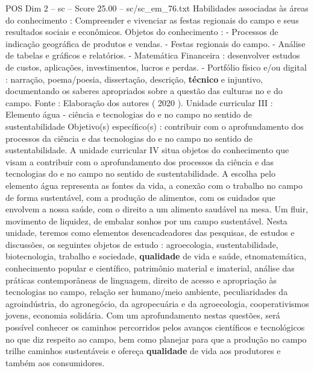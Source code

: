 \begin{textsample}{POS Dim 2 – sc – Score 25.00 – sc/sc\_em\_76.txt}
Habilidades associadas às áreas do conhecimento : Compreender e vivenciar as festas regionais do campo e seus resultados sociais e econômicos.
Objetos do conhecimento : - Processos de indicação geográfica de produtos e vendas. - Festas regionais do campo. - Análise de tabelas e gráficos e relatórios. - Matemática Financeira : desenvolver estudos de custos, aplicações, investimentos, lucros e perdas. - Portfólio físico e/ou digital : narração, poema/poesia, dissertação, descrição, \textbf{técnico} e injuntivo, documentando os saberes apropriados sobre a questão das culturas no e do campo.
Fonte : Elaboração dos autores ( 2020 ).
Unidade curricular III : Elemento água - ciência e tecnologias do e no campo no sentido de sustentabilidade Objetivo(s) específico(s) : contribuir com o aprofundamento dos processos da ciência e das tecnologias do e no campo no sentido de sustentabilidade.
A unidade curricular IV situa objetos do conhecimento que visam a contribuir com o aprofundamento dos processos da ciência e das tecnologias do e no campo no sentido de sustentabilidade.
A escolha pelo elemento água representa as fontes da vida, a conexão com o trabalho no campo de forma sustentável, com a produção de alimentos, com os cuidados que envolvem a nossa saúde, com o direito a um alimento saudável na mesa.
Um fluir, movimento de liquidez, de embalar sonhos por um campo sustentável.
Nesta unidade, teremos como elementos desencadeadores das pesquisas, de estudos e discussões, os seguintes objetos de estudo : agroecologia, sustentabilidade, biotecnologia, trabalho e sociedade, \textbf{qualidade} de vida e saúde, etnomatemática, conhecimento popular e científico, patrimônio material e imaterial, análise das práticas contemporâneas de linguagem, direito de acesso e apropriação às tecnologias no campo, relação ser humano/meio ambiente, peculiaridades da agroindústria, do agronegócio, da agropecuária e da agroecologia, cooperativismos jovens, economia solidária.
Com um aprofundamento nestas questões, será possível conhecer os caminhos percorridos pelos avanços científicos e tecnológicos no que diz respeito ao campo, bem como planejar para que a produção no campo trilhe caminhos sustentáveis e ofereça \textbf{qualidade} de vida aos produtores e também aos consumidores.

\end{textsample}
